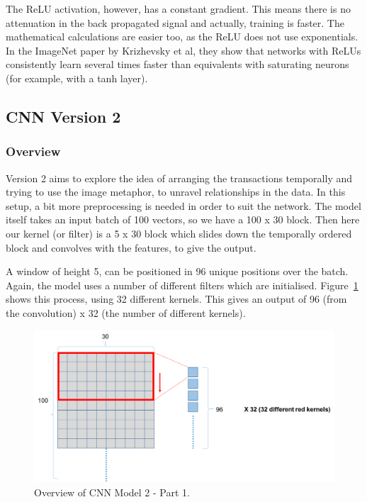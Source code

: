 \documentclass[12pt,a4paper,twoside]{report}
\begin{document}
The ReLU activation, however, has a constant gradient. This means there is no attenuation in the back propagated signal and actually, training is faster. The mathematical calculations are easier too, as the ReLU does not use exponentials. In the ImageNet\cite{krizhevsky2012imagenet} paper by Krizhevsky et al, they show that networks with ReLUs consistently learn several times faster than equivalents with saturating neurons (for example, with a tanh layer).

\subsection{CNN Version 2}

\subsubsection{Overview}

Version 2 aims to explore the idea of arranging the transactions temporally and trying to use the image metaphor, to unravel relationships in the data. In this setup, a bit more preprocessing is needed in order to suit the network. The model itself takes an input batch of 100 vectors, so we have a 100 x 30 block. Then here our kernel (or filter) is a 5 x 30 block which slides down the temporally ordered block and convolves with the features, to give the output. 

A window of height 5, can be positioned in 96 unique positions over the batch. Again, the model uses a number of different filters which are initialised. Figure~\ref{fig:cnnv2-1} shows this process, using 32 different kernels. This gives an output of 96 (from the convolution) x 32 (the number of different kernels).

\begin{figure}[!htbp]
\centering
\includegraphics[scale=0.5]{cnnv2-1}
\caption{Overview of CNN Model 2 - Part 1.}
\label{fig:cnnv2-1}
\end{figure}
\end{document}
